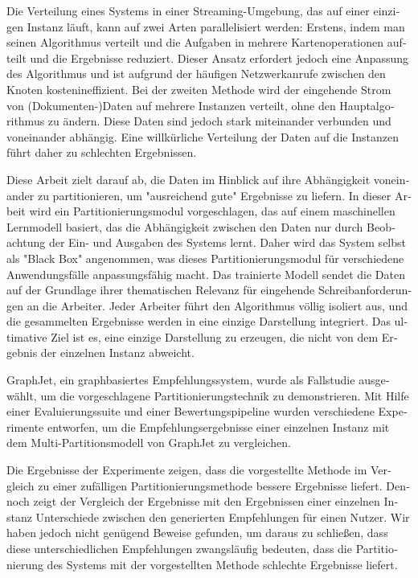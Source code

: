 \null\vfil
\begin{otherlanguage}{ngerman}
\begin{center}\textsf{\textbf{\abstractname}}\end{center}

\noindent 
Die Verteilung eines Systems in einer Streaming-Umgebung, das auf einer einzigen Instanz läuft, kann auf zwei Arten parallelisiert werden: Erstens, indem man seinen Algorithmus verteilt und die Aufgaben in mehrere Kartenoperationen aufteilt und die Ergebnisse reduziert. Dieser Ansatz erfordert jedoch eine Anpassung des Algorithmus und ist aufgrund der häufigen Netzwerkanrufe zwischen den Knoten kostenineffizient. Bei der zweiten Methode wird der eingehende Strom von (Dokumenten-)Daten auf mehrere Instanzen verteilt, ohne den Hauptalgorithmus zu ändern. Diese Daten sind jedoch stark miteinander verbunden und voneinander abhängig. Eine willkürliche Verteilung der Daten auf die Instanzen führt daher zu schlechten Ergebnissen.

Diese Arbeit zielt darauf ab, die Daten im Hinblick auf ihre Abhängigkeit voneinander zu partitionieren, um "ausreichend gute" Ergebnisse zu liefern. In dieser Arbeit wird ein Partitionierungsmodul vorgeschlagen, das auf einem maschinellen Lernmodell basiert, das die Abhängigkeit zwischen den Daten nur durch Beobachtung der Ein- und Ausgaben des Systems lernt. Daher wird das System selbst als "Black Box" angenommen, was dieses Partitionierungsmodul für verschiedene Anwendungsfälle anpassungsfähig macht. Das trainierte Modell sendet die Daten auf der Grundlage ihrer thematischen Relevanz für eingehende Schreibanforderungen an die Arbeiter. Jeder Arbeiter führt den Algorithmus völlig isoliert aus, und die gesammelten Ergebnisse werden in eine einzige Darstellung integriert. Das ultimative Ziel ist es, eine einzige Darstellung zu erzeugen, die nicht von dem Ergebnis der einzelnen Instanz abweicht.

GraphJet, ein graphbasiertes Empfehlungssystem, wurde als Fallstudie ausgewählt, um die vorgeschlagene Partitionierungstechnik zu demonstrieren. Mit Hilfe einer Evaluierungssuite und einer Bewertungspipeline wurden verschiedene Experimente entworfen, um die Empfehlungsergebnisse einer einzelnen Instanz mit dem Multi-Partitionsmodell von GraphJet zu vergleichen.


Die Ergebnisse der Experimente zeigen, dass die vorgestellte Methode im Vergleich zu einer zufälligen Partitionierungsmethode bessere Ergebnisse liefert. Dennoch zeigt der Vergleich der Ergebnisse mit den Ergebnissen einer einzelnen Instanz Unterschiede zwischen den generierten Empfehlungen für einen Nutzer. Wir haben jedoch nicht genügend Beweise gefunden, um daraus zu schließen, dass diese unterschiedlichen Empfehlungen zwangsläufig bedeuten, dass die Partitionierung des Systems mit der vorgestellten Methode schlechte Ergebnisse liefert.

\end{otherlanguage}
\vfil\null



